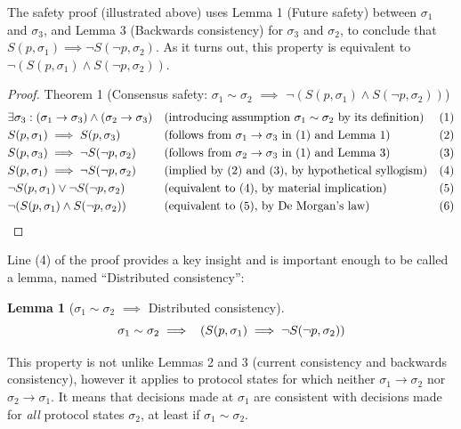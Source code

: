 \documentclass{article}
\theoremstyle{definition}
\newtheorem{lemma}{Lemma}
\begin{document}
The safety proof (illustrated above) uses Lemma 1 (Future safety) between $\sigma_1$ and $\sigma_3$, and Lemma 3 (Backwards consistency) for $\sigma_3$ and $\sigma_2$, to conclude that $S(p,\sigma_1) \implies \neg{S(\neg{p},\sigma_2)}$. As it turns out, this property is equivalent to $\neg{(S(p,\sigma_1)\land S(\neg{p},\sigma_2))}$.


\begin{proof}
Theorem 1 (Consensus safety: $\sigma_1 \sim \sigma_2$ $\implies$ $\neg(S(p,\sigma_1) \land S(\neg{p},\sigma_2))$)
\begin{align*}
  &\exists \sigma_3:(\sigma_1 \to \sigma_3) \land (\sigma_2 \to \sigma_3) &&\text{(introducing assumption $\sigma_1 \sim \sigma_2$ by its definition)} &&\text{(1)} \\
  &S(p,\sigma_1) \implies S(p,\sigma_3) &&\text{(follows from $\sigma_1 \to \sigma_3$ in (1) and Lemma 1)} &&\text{(2)} \\
  &S(p,\sigma_3) \implies \neg{S(\neg{p},\sigma_2)} &&\text{(follows from $\sigma_2 \to \sigma_3$ in (1) and Lemma 3)} &&\text{(3)} \\
  &S(p,\sigma_1) \implies \neg{S(\neg{p},\sigma_2)} &&\text{(implied by (2) and (3), by hypothetical syllogism)} &&\text{(4)} \\
  &\neg{S(p,\sigma_1)} \lor \neg{S(\neg{p},\sigma_2)} &&\text{(equivalent to (4), by material implication)} &&\text{(5)} \\
  &\neg(S(p,\sigma_1) \land S(\neg{p},\sigma_2)) \hspace{5mm} \qedhere &&\text{(equivalent to (5), by De Morgan's law)}&&\text{(6)}
\end{align*}
\end{proof}

Line (4) of the proof provides a key insight and is important enough to be called a lemma, named ``Distributed consistency'':
 
\begin{lemma}[$\sigma_1 \sim \sigma_2$ $\implies$ Distributed consistency]
$$
\sigma_1 \sim \sigma_2 \implies \hspace{2mm} (S(p,\sigma_1) \implies \neg{S(\neg{p},\sigma_2)})
$$
\end{lemma}

This property is not unlike Lemmas 2 and 3 (current consistency and backwards consistency), however it applies to protocol states for which neither $\sigma_1 \to \sigma_2$ nor $\sigma_2 \to \sigma_1$. It means that decisions made at $\sigma_1$ are consistent with decisions made for \emph{all} protocol states $\sigma_2$, at least if $\sigma_1 \sim \sigma_2$.
\end{document}

